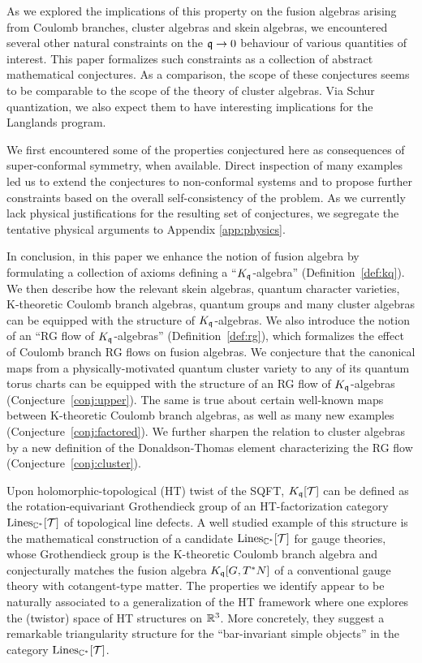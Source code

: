 \documentclass[12pt]{amsart}
\begin{document}
As we explored the implications of this property on the fusion algebras arising from Coulomb branches, cluster algebras and skein algebras, we encountered several other natural constraints on the $\mathfrak{q} \to 0$ behaviour of various quantities of interest. This paper formalizes such constraints as a collection of abstract mathematical conjectures. As a comparison, the scope of these conjectures seems to be comparable to the scope of the theory of cluster algebras. Via Schur quantization, we also expect them to have interesting implications for the Langlands program. 

We first encountered some of the properties conjectured here as consequences of super-conformal symmetry, when available. Direct inspection of many examples led us to extend the conjectures to non-conformal systems and to propose further constraints based on the overall self-consistency of the problem. As we currently lack physical justifications for the resulting set of conjectures, we segregate the tentative physical arguments to Appendix \ref{app:physics}. 

In conclusion, in this paper we enhance the notion of fusion algebra by formulating a collection of axioms defining a ``$K_{\mathfrak{q}}$-algebra'' (Definition~\ref{def:kq}). We then describe how the relevant skein algebras, quantum character varieties, K-theoretic Coulomb branch algebras, quantum groups and many cluster algebras can be equipped with the structure of $K_{\mathfrak{q}}$-algebras. 
We also introduce the notion of an ``RG flow of $K_{\mathfrak{q}}$-algebras'' (Definition~\ref{def:rg}), which formalizes the effect of Coulomb branch RG flows on fusion algebras. We conjecture that the canonical maps from a physically-motivated quantum cluster variety to any of its quantum torus charts can be equipped with the structure of an RG flow of $K_{\mathfrak{q}}$-algebras (Conjecture~\ref{conj:upper}). The same is true about certain well-known maps between K-theoretic Coulomb branch algebras, as well as many new examples (Conjecture~\ref{conj:factored}). We further sharpen the 
relation to cluster algebras by a new definition of the Donaldson-Thomas element characterizing the RG flow (Conjecture~\ref{conj:cluster}). 

Upon holomorphic-topological (HT) twist of the SQFT, $K_{\mathfrak{q}}[{\mathcal T}]$ can be defined as the rotation-equivariant Grothendieck group of an HT-factorization category $\mathrm{Lines}_{\mathbb{C}^*}[{\mathcal T}]$ of topological line defects. 
A well studied example of this structure is the mathematical construction \cite{Cautis:2018gzt,Cautis:2023jkq} of a candidate $\mathrm{Lines}_{\mathbb{C}^*}[{\mathcal T}]$ for gauge theories, whose Grothendieck group is the K-theoretic Coulomb branch algebra and conjecturally matches the fusion algebra $K_{\mathfrak{q}}[G,T^*N]$ of a conventional gauge theory with cotangent-type matter. The properties we identify appear to be naturally associated to a generalization of the HT framework where one explores the (twistor) space of HT structures on $\mathbb{R}^3$.  More concretely, they suggest a remarkable triangularity structure for the ``bar-invariant simple objects'' in the category $\mathrm{Lines}_{\mathbb{C}^*}[{\mathcal T}]$.
\end{document}
